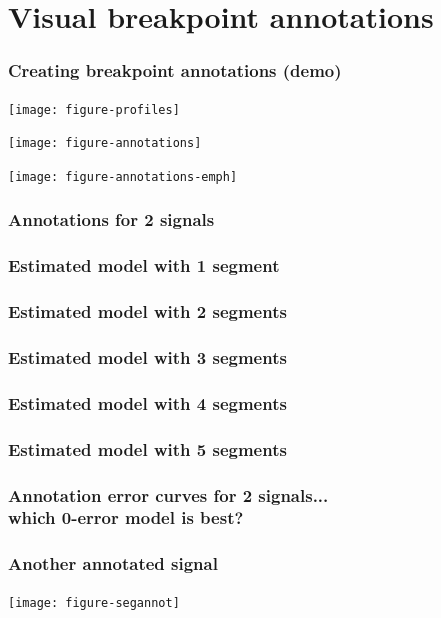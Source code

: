 \documentclass{beamer}
\begin{document}
\section{Visual breakpoint annotations}

  \begin{frame} \frametitle{Creating breakpoint annotations (demo)}
    \texttt{[image: figure-profiles]}
  \end{frame}

  \begin{frame}
    \texttt{[image: figure-annotations]}
  \end{frame}

  \begin{frame}
    \texttt{[image: figure-annotations-emph]}
  \end{frame}

  \begin{frame}
    \frametitle{Annotations for 2 signals}
    
  \end{frame}

  \begin{frame}
    \frametitle{Estimated model with 1 segment}
    
  \end{frame}

  \begin{frame}
    \frametitle{Estimated model with 2 segments}
    
  \end{frame}

  \begin{frame}
    \frametitle{Estimated model with 3 segments}
    
  \end{frame}

  \begin{frame}
    \frametitle{Estimated model with 4 segments}
    
  \end{frame}

  \begin{frame}
    \frametitle{Estimated model with 5 segments}
    
  \end{frame}

  \begin{frame}
    \frametitle{Annotation error curves for 2 signals...\\which
      0-error model is best?}
    
  \end{frame}

  \begin{frame}
    \frametitle{Another annotated signal}
    \texttt{[image: figure-segannot]}
  \end{frame}
\end{document}
